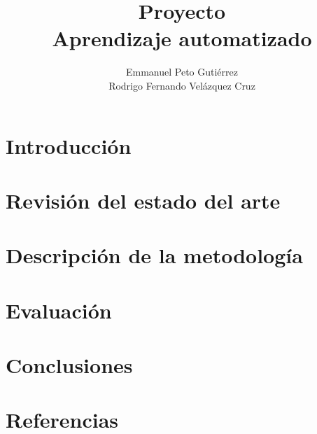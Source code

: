 \documentclass{article}
\title{Proyecto\\Aprendizaje automatizado}
\author{Emmanuel Peto Gutiérrez\\Rodrigo Fernando Velázquez Cruz}
\begin{document}

\section{Introducción}

\section{Revisión del estado del arte}

\section{Descripción de la metodología}

\section{Evaluación}

\section{Conclusiones}

\section{Referencias}
\end{document}
